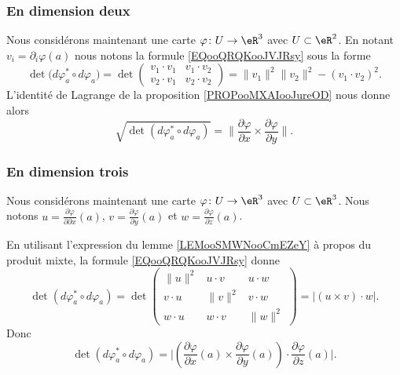 \subsubsection{En dimension deux}

Nous considérons maintenant une carte \( \varphi\colon U\to \eR^3\) avec \( U\subset \eR^2\). En notant \( v_i=\partial_i\varphi(a)\) nous notons la formule \eqref{EQooQRQKooJVJRsy} sous la forme
\begin{equation}
    \det\big( d\varphi_a^*\circ d\varphi_a \big)=
    \det\begin{pmatrix}
        v_1\cdot v_1    &   v_1\cdot v_2    \\ 
        v_2\cdot v_1    &   v_2\cdot v_2    
    \end{pmatrix}=\| v_1 \|^2\| v_2 \|^2-(v_1\cdot v_2)^2.
\end{equation}
L'identité de Lagrange de la proposition \ref{PROPooMXAIooJureOD} nous donne alors
\begin{equation}
    \sqrt{ \det(d\varphi_a^*\circ d\varphi_a )  }=\| \frac{ \partial \varphi }{ \partial x }\times \frac{ \partial \varphi }{ \partial y } \|.
\end{equation}

\subsubsection{En dimension trois}

Nous considérons maintenant une carte \( \varphi\colon U\to \eR^3\) avec \( U\subset \eR^3\). Nous notons \( u=\frac{ \partial \varphi }{ \partial \partial x }(a)\), \( v=\frac{ \partial \varphi }{ \partial y }(a)\) et \( w=\frac{ \partial \varphi }{ \partial z }(a)\). 

En utilisant l'expression du lemme \ref{LEMooSMWNooCmEZeY} à propos du produit mixte, la formule \ref{EQooQRQKooJVJRsy} donne
\begin{equation}
    \det(d\varphi_a^*\circ d\varphi_a)=\det\begin{pmatrix}
        \| u \|^2    &   u\cdot v    &   u\cdot w    \\
        v\cdot u    &   \| v \|^2    &   v\cdot w    \\
        w\cdot u    &   w\cdot v    &   \| w \|^2
    \end{pmatrix}=\big| (u\times v)\cdot w \big|.
\end{equation}
Donc 
\begin{equation}        \label{EQooYIJSooHtkXfu}
    \det(d\varphi_a^*\circ d\varphi_a)=\big| (\frac{ \partial \varphi }{ \partial x }(a)\times \frac{ \partial \varphi }{ \partial y }(a))\cdot \frac{ \partial \varphi }{ \partial z }(a) \big|.
\end{equation}

